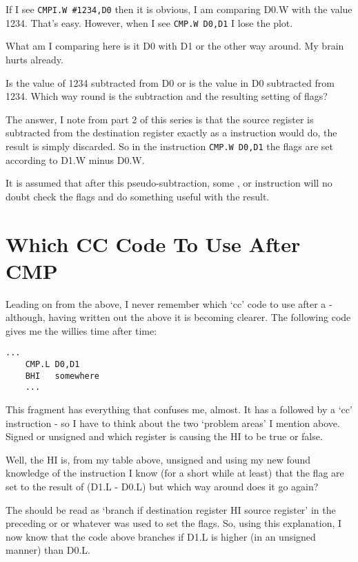 If I see \lstinline{CMPI.W #1234,D0} then it is obvious, I am comparing D0.W with the
        value 1234. That's easy. However, when I see \lstinline{CMP.W D0,D1} I lose the plot.

What am I comparing here is it D0 with D1 or the other way around. My brain
        hurts already.

Is the value of 1234 subtracted from D0 or is the value in D0 subtracted
        from 1234. Which way round is the subtraction and the resulting setting of
        flags?

The answer, I note from part 2 of this series is that the source register is
        subtracted from the destination register exactly as a  instruction would do,
        the result is simply discarded. So in the instruction \lstinline{CMP.W D0,D1} the flags are
        set according to D1.W minus D0.W.

It is assumed that after this pseudo-{}subtraction, some ,  or  instruction will no doubt check the flags and do something useful with the
        result.

\section{Which CC Code To Use After CMP}
\label{ch19-cc-code-after-cmp}%

Leading on from the above, I never remember which `cc' code to use after a
         -{} although, having written out the above it is becoming clearer. The following
        code gives me the willies time after time:

\begin{lstlisting}[firstnumber=1,]
    ...
    CMP.L D0,D1
    BHI   somewhere
    ...
\end{lstlisting}

This fragment has everything that confuses me, almost. It has a  followed
        by a `cc' instruction -{} so I have to think about the two `problem areas' I mention
        above. Signed or unsigned and which register is causing the HI to be true or
        false.

Well, the HI is, from my table above, unsigned and using my new found
        knowledge of the  instruction I know (for a short while at least) that the flag
        are set to the result of (D1.L -{} D0.L) but which way around does it go
        again?

The  should be read as `branch if destination register HI source
        register' in the preceding  or  or whatever was used to set the flags. So,
        using this explanation, I now know that the code above branches if D1.L is higher
        (in an unsigned manner) than D0.L.

